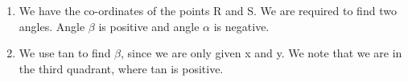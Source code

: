 {\begin{mdframed}[linewidth=4, leftmargin=40, rightmargin=40]
\begin{exercise}
\begin{enumerate}[noitemsep, label=\textbf{Step} \textbf{\arabic*}. ]
            \leftskip=20pt\rightskip=\leftskip\item  
        \label{m39411*id81936}We have the co-ordinates of the points R and S. We are required to find two angles. Angle \begin{math}\beta \end{math} is positive and angle \begin{math}\alpha \end{math} is negative.\par 
        \item  
        \label{m39411*id8267}We use tan to find \begin{math}\beta \end{math}, since we are only given x and y. We note that we are in the third quadrant, where tan is positive.\par 
        \label{m39411*id82128}\nopagebreak\noindent{}
\end{enumerate}
\end{exercise}
\end{mdframed}}
